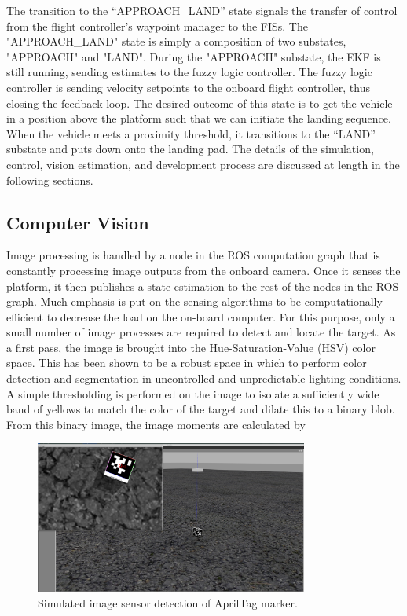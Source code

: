 The transition to the ``APPROACH\_LAND'' state signals the transfer of control from the flight controller's
waypoint manager to the FISs. The "APPROACH\_LAND" state is simply a composition of two substates, "APPROACH"
and "LAND". During the "APPROACH" substate, the EKF is still running, sending estimates to the fuzzy logic
controller. The fuzzy logic controller is sending velocity setpoints to the onboard flight controller, thus
closing the feedback loop. The desired outcome of this state is to get the vehicle in a position above
the platform such that we can initiate the landing sequence. When the vehicle meets a proximity threshold,
it transitions to the ``LAND'' substate and puts down onto the landing pad. The details of the simulation,
control, vision estimation, and development process are discussed at length in the following sections.

\subsection{Computer Vision}\label{s:landing:cv}
Image processing is handled by a node in the ROS computation graph that is constantly processing image outputs
from the onboard camera. Once it senses the platform, it then publishes
a state estimation to the rest of the nodes in the ROS graph. Much emphasis is put on the sensing algorithms to be computationally efficient to decrease the load on the
on-board computer. For this purpose, only a small number of image processes are required to detect and locate
the target. As a first pass, the image is brought into the Hue-Saturation-Value (HSV) color space. This has
been shown to be a robust space in which to perform color detection and segmentation in uncontrolled and
unpredictable lighting conditions\cite{zhao2002robust}. A simple thresholding is performed on the image to
isolate a sufficiently wide band of yellows to match the color of the target and dilate this to a binary blob.
From this binary image, the image moments are calculated by
\begin{figure}[ht!]
    \centering
    \includegraphics[width=0.8\textwidth]{images/rs_working_apriltags_crop.png}
    \caption{Simulated image sensor detection of AprilTag marker.}\label{f:apriltag}
\end{figure}

